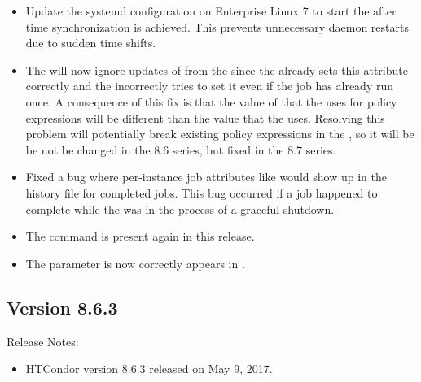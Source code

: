 \begin{itemize}
\item Update the systemd configuration on Enterprise Linux 7 to start the
 after time synchronization is achieved. This prevents
unnecessary daemon restarts due to sudden time shifts.

\item The  will now ignore updates of 
from the  since the  already sets this
attribute correctly and the  incorrectly tries to set it
even if the job has already run once. A consequence of this fix is that the
value of  that the  uses for policy
expressions will be different than the value that the  uses.
Resolving this problem will potentially break existing policy expressions
in the , so it will be be not be changed in the 8.6 series,
but fixed in the 8.7 series.

\item Fixed a bug where per-instance job attributes like 
would show up in the history file for completed jobs.  This bug occurred if
a job happened to complete while the  was in the process of a
graceful shutdown.

\item The  command is present again in this release.

\item The parameter  is now correctly
appears in .

\end{itemize}

\subsection*{\label{sec:New-8-6-3}Version 8.6.3}

\noindent Release Notes:

\begin{itemize}

\item HTCondor version 8.6.3 released on May 9, 2017.

\end{itemize}

